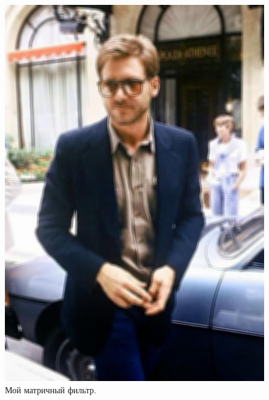\documentclass[a4paper,12pt]{article}
\begin{document}
\begin{figure}[h]
\begin{center}
\begin{minipage}[h]{0.3\linewidth}
\includegraphics[width=1\linewidth]{Pic_matrix_MyMatrixFilter}
Мой матричный фильтр.
\end{minipage}
\end{center}

\end{figure}


\newpage
\end{document}
